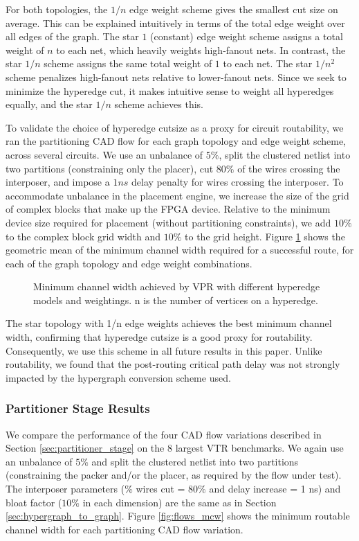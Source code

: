 For both topologies, the $1/n$ edge weight scheme gives the smallest cut size on average. This can be explained intuitively in terms of the total edge weight over all edges of the graph. The star $1$ (constant) edge weight scheme assigns a total weight of $n$ to each net, which heavily weights high-fanout nets. In contrast, the star $1/n$ scheme assigns the same total weight of $1$ to each net. The star $1/n^2$ scheme penalizes high-fanout nets relative to lower-fanout nets. Since we seek to minimize the hyperedge cut, it makes intuitive sense to weight all hyperedges equally, and the star $1/n$ scheme achieves this.

To validate the choice of hyperedge cutsize as a proxy for circuit routability, we ran the partitioning CAD flow for each graph topology and edge weight scheme, across several circuits. We use an unbalance of $5\%$, split the clustered netlist into two partitions (constraining only the placer), cut $80\%$ of the wires crossing the interposer, and impose a $1ns$ delay penalty for wires crossing the interposer. To accommodate unbalance in the placement engine, we increase the size of the grid of complex blocks that make up the FPGA device. Relative to the minimum device size required for placement (without partitioning constraints), we add $10\%$ to the complex block grid width and $10\%$ to the grid height. Figure \ref{fig:graph_topology_mcw} shows the geometric mean of the minimum channel width required for a successful route, for each of the graph topology and edge weight combinations.

\begin{figure}[!htbp]
\centering

\caption{Minimum channel width achieved by VPR with different hyperedge models and weightings. n is the number of vertices on a hyperedge.}
\label{fig:graph_topology_mcw}
\end{figure}

The star topology with 1/n edge weights achieves the best minimum channel width, confirming that hyperedge cutsize is a good proxy for routability. Consequently, we use this scheme in all future results in this paper. Unlike routability, we found that the post-routing critical path delay was not strongly impacted by the hypergraph conversion scheme used.

\subsubsection{Partitioner Stage Results}\label{sec:partitioner_stage_results}
We compare the performance of the four CAD flow variations described in Section \ref{sec:partitioner_stage} on the 8 largest VTR benchmarks. We again use an unbalance of $5\%$ and split the clustered netlist into two partitions (constraining the packer and/or the placer, as required by the flow under test). The interposer parameters (\% wires cut = $80\%$ and delay increase = 1 ns) and bloat factor ($10\%$ in each dimension) are the same as in Section \ref{sec:hypergraph_to_graph}. Figure \ref{fig:flows_mcw} shows the minimum routable channel width for each partitioning CAD flow variation.


